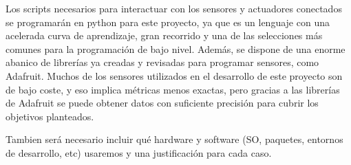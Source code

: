 Los scripts necesarios para interactuar con los sensores y actuadores conectados se programarán en python para este proyecto, ya que es un lenguaje con una acelerada curva de aprendizaje, gran recorrido y una de las selecciones más comunes para la programación de bajo nivel. Además, se dispone de una enorme abanico de librerías ya creadas y revisadas para programar sensores, como Adafruit. Muchos de los sensores utilizados en el desarrollo de este proyecto son de bajo coste, y eso implica métricas menos exactas, pero gracias a las librerías de Adafruit se puede obtener datos con suficiente precisión para cubrir los objetivos planteados.


Tambien será necesario incluir qué hardware y software (SO, paquetes, entornos de desarrollo, etc) usaremos y una justificación para cada caso.
